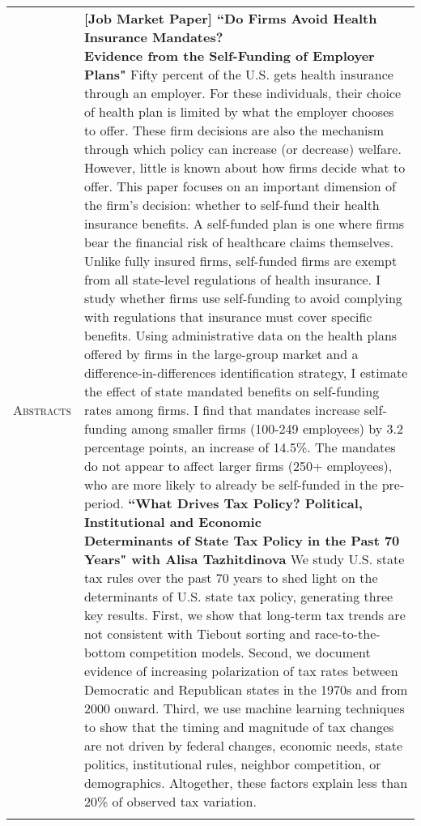 \documentclass[11pt]{article}
\begin{document}
\begin{tabularx}{\textwidth}{@{}Y Z@{}}
	\textsc{Abstracts}  & 
	\textbf{[Job Market Paper] ``Do Firms Avoid Health Insurance Mandates? \newline Evidence from the Self-Funding of Employer Plans"} 
	\vspace{5pt} \newline
	Fifty percent of the U.S. gets health insurance through an employer. For these individuals, their choice of health plan is limited by what the employer chooses to offer. These firm decisions are also the mechanism through which policy can increase (or decrease) welfare. However, little is known about how firms decide what to offer. This paper focuses on an important dimension of the firm's decision: whether to self-fund their health insurance benefits. A self-funded plan is one where firms bear the financial risk of healthcare claims themselves. Unlike fully insured firms, self-funded firms are exempt from all state-level regulations of health insurance. I study whether firms use self-funding to avoid complying with regulations that insurance must cover specific benefits. Using administrative data on the health plans offered by firms in the large-group market and a difference-in-differences identification strategy, I estimate the effect of state mandated benefits on self-funding rates among firms. I find that mandates increase self-funding among smaller firms (100-249 employees) by 3.2 percentage points, an increase of 14.5\%. The mandates do not appear to affect larger firms (250+ employees), who are more likely to already be self-funded in the pre-period.
	\vspace{20pt} \newline
	\textbf{``What Drives Tax Policy? Political, Institutional and Economic \newline Determinants of State Tax Policy in the Past 70 Years" with Alisa Tazhitdinova} 
	\vspace{-8pt} \newline 
	We study U.S. state tax rules over the past 70 years to shed light on the determinants of U.S. state tax policy, generating three key results. First, we show that long-term tax trends are not consistent with Tiebout sorting and race-to-the-bottom competition models. Second, we document evidence of increasing polarization of tax rates between Democratic and Republican states in the 1970s and from 2000 onward. Third, we use machine learning techniques to show that the timing and magnitude of tax changes are not driven by federal changes, economic needs, state politics, institutional rules, neighbor competition, or demographics. Altogether, these factors explain less than 20\% of observed tax variation.
	\\
	\newpage
	

\end{tabularx}
\end{document}
